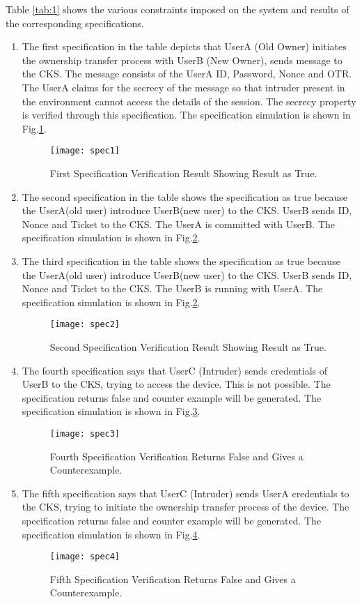 \documentclass[letterpaper]{article}
\begin{document}
Table \ref{tab:1} shows the various constraints imposed on the system and results of the corresponding specifications.
\begin{enumerate}
	\item The first specification in the table depicts that UserA (Old Owner) initiates the ownership transfer process with UserB (New Owner), sends message to the CKS. The message consists of the UserA ID, Password, Nonce and OTR. The UserA claims for the secrecy of the message so that intruder present in the environment cannot access the details of the session. The secrecy property is verified through this specification. The specification simulation is shown in Fig.\ref{spec1}.	
	\begin{figure}[bpht!]
	\centering
		\texttt{[image: spec1]}
	\caption{First Specification Verification Result Showing Result as True.}
	\label{spec1}
\end{figure}
\item The second specification in the table shows the specification as true because the UserA(old user) introduce UserB(new user) to the CKS. UserB sends ID, Nonce and Ticket to the CKS. The UserA is committed with UserB. The specification simulation is shown in Fig.\ref{spec2}.
\item The third specification in the table shows the specification as true because the UserA(old user) introduce UserB(new user) to the CKS. UserB sends ID, Nonce and Ticket to the CKS. The UserB is running with UserA. The specification simulation is shown in Fig.\ref{spec2}.

\begin{figure}[bpht!]
	\centering
		\texttt{[image: spec2]}
	\caption{Second Specification Verification Result Showing Result as True.}
	\label{spec2}
\end{figure}
	 
	\item The fourth specification says that UserC (Intruder) sends credentials of UserB to the CKS, trying to access the device. This is  not possible. The specification returns false and counter example will be generated. The specification simulation is shown in Fig.\ref{spec3}.	 
	 \begin{figure}[bpht!]
	\centering
		\texttt{[image: spec3]}
	\caption{Fourth Specification Verification Returns False and Gives a Counterexample.}
	\label{spec3}
\end{figure} 

\item The fifth specification says that UserC (Intruder) sends UserA credentials to the CKS, trying to initiate the ownership transfer process of the device. The specification returns false and counter example will be generated. The specification simulation is shown in Fig.\ref{spec4}.	 
\begin{figure}[bpht!]
	\centering
		\texttt{[image: spec4]}
	\caption{Fifth Specification Verification Returns False and Gives a Counterexample.}
	\label{spec4}
\end{figure} 

\end{enumerate}
\end{document}
